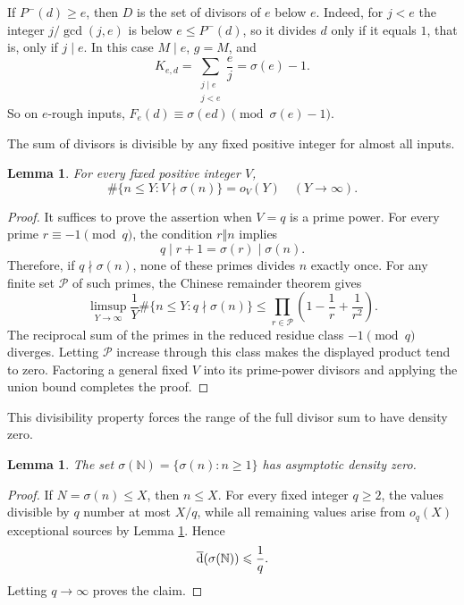 \documentclass[11pt,letterpaper,reqno]{amsart}
\numberwithin{equation}{section}
\newtheorem{lemma}[theorem]{Lemma}
\theoremstyle{remark}
\newcommand{\N}{\mathbb{N}}
\newcommand{\1}{\mathbf 1}
\newcommand{\upperdens}{\overline{\textup{d}}}
\renewcommand{\leq}{\leqslant}
\renewcommand{\geq}{\geqslant}
\begin{document}
If $P^-(d)\geq e$, then $D$ is the set of divisors of $e$ below $e$.
Indeed, for $j<e$ the integer $j/\gcd(j,e)$ is below $e\leq P^-(d)$, so it
divides $d$ only if it equals $1$, that is, only if $j\mid e$. In this
case $M\mid e$, $g=M$, and
\[
 K_{e,d}=\sum_{\substack{j\mid e\\ j<e}}\frac ej=\sigma(e)-1 .
\]
So on $e$-rough inputs, $F_e(d)\equiv\sigma(ed)\pmod{\sigma(e)-1}$.

The sum of divisors is divisible by any fixed positive integer for almost all inputs.

\begin{lemma}
\label{lem:fixed-modulus-normality}
For every fixed positive integer $V$,
\[
 \#\{n\leq Y:V\nmid\sigma(n)\}=o_V(Y)
 \quad(Y\to\infty).
\]
\end{lemma}

\begin{proof}
It suffices to prove the assertion when $V=q$ is a prime power. For every
prime $r\equiv-1\pmod q$, the condition $r\Vert n$ implies
\[
 q\mid r+1=\sigma(r)\mid\sigma(n).
\]
Therefore, if $q\nmid\sigma(n)$, none of these primes divides $n$ exactly
once. For any finite set $\mathcal{P}$ of such primes, the Chinese remainder
theorem gives
\[
 \limsup_{Y\to\infty}\frac1Y
 \#\{n\leq Y:q\nmid\sigma(n)\}
 \leq\prod_{r\in\mathcal{P}}
 \left(1-\frac1r+\frac1{r^2}\right).
\]
The reciprocal sum of the primes in the reduced residue class
$-1\pmod q$ diverges. Letting $\mathcal{P}$ increase through this class makes
the displayed product tend to zero. Factoring a general fixed $V$ into its
prime-power divisors and applying the union bound completes the proof.
\end{proof}

This divisibility property forces the range of the full divisor sum to have density zero.

\begin{lemma}
\label{lem:sigma-range-zero}
The set $\sigma(\N)=\{\sigma(n):n\geq1\}$ has asymptotic density zero.
\end{lemma}

\begin{proof}
If $N=\sigma(n)\leq X$, then $n\leq X$. For every fixed integer $q\geq2$,
the values divisible by $q$ number at most $X/q$, while all remaining values
arise from $o_q(X)$ exceptional sources by
Lemma \ref{lem:fixed-modulus-normality}. Hence
\[
 \upperdens(\sigma(\N))\leq\frac1q.
\]
Letting $q\to\infty$ proves the claim.
\end{proof}
\end{document}
